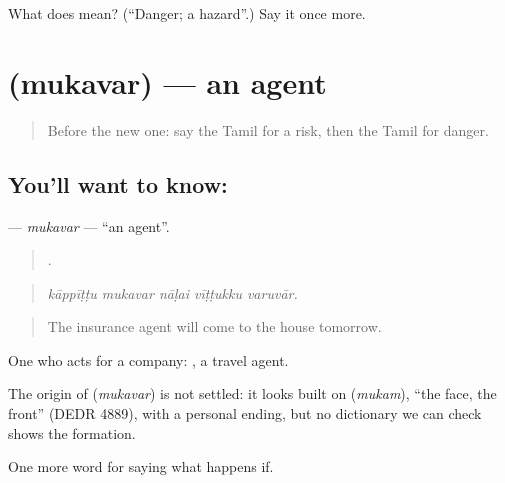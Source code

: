 \begin{tcolorbox}[breakable,colback=teal!4,colframe=teal!35!black,title={Before you move on}]
What does  mean? (\textquotedblleft{}Danger; a hazard\textquotedblright{}.) Say it once more.
\end{tcolorbox}
\section[\texorpdfstring{\ta{முகவர்} (mukavar)}{முகவர் (mukavar)}]{ (mukavar) — an agent}

\label{lesson:TA-C541-mukavar}



\begin{quote}
Before the new one: say the Tamil for a risk, then the Tamil for danger.
\end{quote}

\subsection*{You'll want to know: }
\textbf{} — \emph{mukavar} — \textquotedblleft{}an agent\textquotedblright{}.

\begin{quote}
    .
\end{quote}

\begin{quote}
\emph{kāppīṭṭu mukavar nāḷai vīṭṭukku varuvār.}
\end{quote}

\begin{quote}
The insurance agent will come to the house tomorrow.
\end{quote}

One who acts for a company:  , a travel agent.

\begin{cousinweb}
The origin of \textbf{} (\emph{mukavar}) is not settled: it looks built on  (\emph{mukam}), \textquotedblleft{}the face, the front\textquotedblright{} (DEDR 4889), with a personal ending, but no dictionary we can check shows the formation.
\end{cousinweb}

\begin{grammarlens}[title={What you've built}]
One more word for saying what happens if.
\end{grammarlens}

